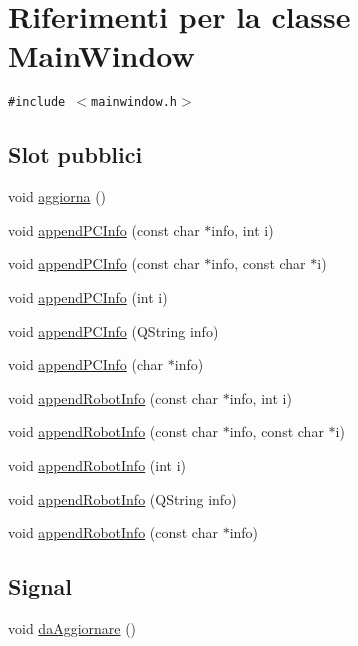 \hypertarget{classMainWindow}{
\section{Riferimenti per la classe Main\-Window}
\label{classMainWindow}
}
{\tt \#include $<$mainwindow.h$>$}

\subsection*{Slot pubblici}
\begin{CompactItemize}
\item 
void \hyperlink{classMainWindow_2f955c2c4215bb50acc5d76e5fb99402}{aggiorna} ()
\item 
void \hyperlink{classMainWindow_9155ed247a9ce2d4084737e12be86e7b}{append\-PCInfo} (const char $\ast$info, int i)
\item 
void \hyperlink{classMainWindow_6c1312a8d376cb19366cce1e084ce01b}{append\-PCInfo} (const char $\ast$info, const char $\ast$i)
\item 
void \hyperlink{classMainWindow_1fa8f6b4ad5becd6b6adb85c18f3a238}{append\-PCInfo} (int i)
\item 
void \hyperlink{classMainWindow_00ae5979048fe2b58d6d7f3c526d9f85}{append\-PCInfo} (QString info)
\item 
void \hyperlink{classMainWindow_64f8e53725a778a11501dadf09b8c042}{append\-PCInfo} (char $\ast$info)
\item 
void \hyperlink{classMainWindow_8f842edf62781c42283434f16760a307}{append\-Robot\-Info} (const char $\ast$info, int i)
\item 
void \hyperlink{classMainWindow_74763de0eb539f0af358d83a82588fbb}{append\-Robot\-Info} (const char $\ast$info, const char $\ast$i)
\item 
void \hyperlink{classMainWindow_940ed66f4b3c536f9eee7975099ab015}{append\-Robot\-Info} (int i)
\item 
void \hyperlink{classMainWindow_2f18074a740a58891fd5b989dd71cf3f}{append\-Robot\-Info} (QString info)
\item 
void \hyperlink{classMainWindow_a9b4df136ec15062f2eea2c3673c4b57}{append\-Robot\-Info} (const char $\ast$info)
\end{CompactItemize}
\subsection*{Signal}
\begin{CompactItemize}
\item 
void \hyperlink{classMainWindow_149ee428e4d3b41686c3a5e1879b30a2}{da\-Aggiornare} ()
\end{CompactItemize}
